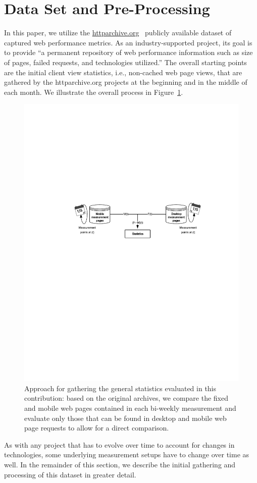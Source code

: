 \documentclass[onecolumn,12pt]{IEEEtran}
\begin{document}
\section{Data Set and Pre-Processing}
\label{s:dataset}
In this paper, we utilize the \url{httparchive.org}~\cite{ht13} publicly available dataset of captured web performance metrics. 
As an industry-supported project, its goal is to provide ``a permanent repository of web performance information such as size of pages, failed requests, and technologies utilized.''
The overall starting points are the initial client view statistics, i.e., non-cached web page views, that are gathered by the httparchive.org projects at the beginning and in the middle of each month.
We illustrate the overall process in Figure~\ref{fig:setup}.
\begin{figure}
	\centering
	\includegraphics[width=.45\linewidth]{setup}
	\caption{Approach for gathering the general statistics evaluated in this contribution: based on the original archives, we compare the fixed and mobile web pages contained in each bi-weekly measurement and evaluate only those that can be found in desktop and mobile web page requests to allow for a direct comparison.}
	\label{fig:setup}
\end{figure}
As with any project that has to evolve over time to account for changes in technologies, some underlying measurement setups have to change over time as well.
In the remainder of this section, we describe the initial gathering and processing of this dataset in greater detail.
\end{document}
